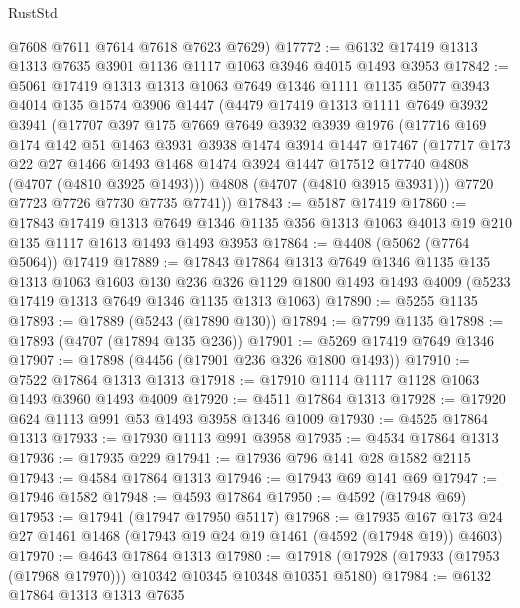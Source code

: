 \begin{lexlean}{RustStd}
\begin{coremodule}
      @7608
      @7611
      @7614
      @7618
      @7623
      @7629)
@17772 := @6132 @17419 @1313 @1313 @7635 @3901 @1136 @1117 @1063 @3946 @4015 @1493 @3953
@17842 := @5061
    @17419
    @1313
    @1313
    @1063
    @7649
    @1346
    @1111
    @1135
    @5077
    @3943
    @4014
    @135
    @1574
    @3906
    @1447
    (@4479
      @17419
      @1313
      @1111
      @7649
      @3932
      @3941
      (@17707
        @397
        @175
        @7669
        @7649
        @3932
        @3939
        @1976
        (@17716
          @169
          @174
          @142
          @51
          @1463
          @3931
          @3938
          @1474
          @3914
          @1447
          @17467
          (@17717
            @173
            @22
            @27
            @1466
            @1493
            @1468
            @1474
            @3924
            @1447
            @17512
            @17740
            @4808
            (@4707 (@4810 @3925 @1493)))
          @4808
          (@4707 (@4810 @3915 @3931)))
        @7720
        @7723
        @7726
        @7730
        @7735
        @7741))
@17843 := @5187 @17419
@17860 := @17843
    @17419
    @1313
    @7649
    @1346
    @1135
    @356
    @1313
    @1063
    @4013
    @19
    @210
    @135
    @1117
    @1613
    @1493
    @1493
    @3953
@17864 := @4408 (@5062 (@7764 @5064)) @17419
@17889 := @17843
    @17864
    @1313
    @7649
    @1346
    @1135
    @135
    @1313
    @1063
    @1603
    @130
    @236
    @326
    @1129
    @1800
    @1493
    @1493
    @4009
    (@5233 @17419 @1313 @7649 @1346 @1135 @1313 @1063)
@17890 := @5255 @1135
@17893 := @17889 (@5243 (@17890 @130))
@17894 := @7799 @1135
@17898 := @17893 (@4707 (@17894 @135 @236))
@17901 := @5269 @17419 @7649 @1346
@17907 := @17898 (@4456 (@17901 @236 @326 @1800 @1493))
@17910 := @7522 @17864 @1313 @1313
@17918 := @17910 @1114 @1117 @1128 @1063 @1493 @3960 @1493 @4009
@17920 := @4511 @17864 @1313
@17928 := @17920 @624 @1113 @991 @53 @1493 @3958 @1346 @1009
@17930 := @4525 @17864 @1313
@17933 := @17930 @1113 @991 @3958
@17935 := @4534 @17864 @1313
@17936 := @17935 @229
@17941 := @17936 @796 @141 @28 @1582 @2115
@17943 := @4584 @17864 @1313
@17946 := @17943 @69 @141 @69
@17947 := @17946 @1582
@17948 := @4593 @17864
@17950 := @4592 (@17948 @69)
@17953 := @17941 (@17947 @17950 @5117)
@17968 := @17935 @167 @173 @24 @27 @1461 @1468 (@17943 @19 @24 @19 @1461 (@4592 (@17948 @19)) @4603)
@17970 := @4643 @17864 @1313
@17980 := @17918 (@17928 (@17933 (@17953 (@17968 @17970))) @10342 @10345 @10348 @10351 @5180)
@17984 := @6132 @17864 @1313 @1313 @7635

\end{coremodule}
\end{lexlean}
